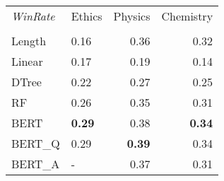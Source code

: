 \begin{tabular}{llrr}
\toprule
\textit{WinRate} & Ethics &  Physics &  Chemistry \\
	  &        &          &            \\
\midrule
Length &   0.16 &     			0.36 &       		0.32 \\
Linear &   0.17 &     			0.19 &       		0.14 \\
DTree  &   0.22 &     			0.27 &       		0.25 \\
RF     &   0.26 &     			0.35 &       		0.31 \\
BERT   &   \textbf{0.29} &     0.38 &       		\textbf{0.34} \\
BERT\_Q &   0.29 &     			\textbf{0.39} &       0.34 \\
BERT\_A &      - &     			0.37 &       		0.31 \\
\bottomrule
\end{tabular}
